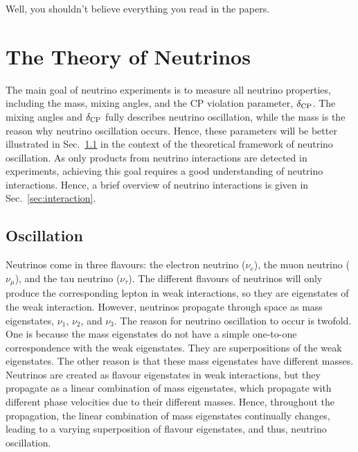 \begin{savequote}[8cm]
Well, you shouldn’t believe
everything you read in the papers.


\end{savequote}

\chapter{\label{ch:nu-theo}The Theory of Neutrinos}
\minitoc
The main goal of neutrino experiments is to measure all neutrino properties, including the mass, mixing angles, and the CP violation parameter, $\delta_\textrm{CP}$. 
The mixing angles and $\delta_\textrm{CP}$ fully describes neutrino oscillation, while the mass is the reason why neutrino oscillation occurs.
Hence, these parameters will be better illustrated in Sec.~\ref{sec:oscillation} in the context of the theoretical framework of neutrino oscillation.
As only products from neutrino interactions are detected in experiments, achieving this goal requires a good understanding of neutrino interactions.
Hence, a brief overview of neutrino interactions is given in Sec.~\ref{sec:interaction}.

\section{Oscillation}
\label{sec:oscillation}
Neutrinos come in three flavours: the electron neutrino ($\nu_e$), the muon neutrino ($\nu_\mu$), and the tau neutrino ($\nu_\tau$).
The different flavours of neutrinos will only produce the corresponding lepton in weak interactions, so they are eigenstates of the weak interaction.
However, neutrinos propagate through space as mass eigenstates, $\nu_1$, $\nu_2$, and $\nu_3$.
The reason for neutrino oscillation to occur is twofold.
One is because the mass eigenstates do not have a simple one-to-one correspondence with the weak eigenstates. 
They are superpositions of the weak eigenstates.
The other reason is that these mass eigenstates have different masses.
Neutrinos are created as flavour eigenstates in weak interactions, but they propagate as a linear combination of mass eigenstates, which propagate with different phase velocities due to their different masses.
Hence, throughout the propagation, the linear combination of mass eigenstates continually changes, leading to a varying superposition of flavour eigenstates, and thus, neutrino oscillation.

